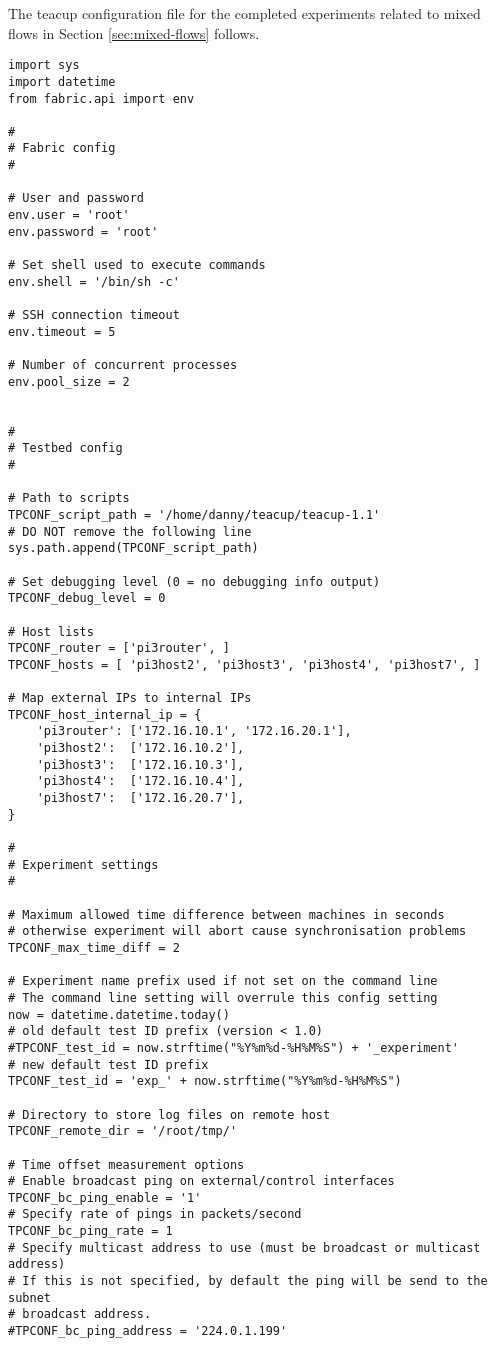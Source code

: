 The \gls{teacup} configuration file for the completed experiments related to mixed flows in Section \ref{sec:mixed-flows} follows.

\begin{code}
\begin{verbatim}
import sys
import datetime
from fabric.api import env

#
# Fabric config
#

# User and password
env.user = 'root'
env.password = 'root'

# Set shell used to execute commands
env.shell = '/bin/sh -c'

# SSH connection timeout
env.timeout = 5

# Number of concurrent processes
env.pool_size = 2


#
# Testbed config
#

# Path to scripts
TPCONF_script_path = '/home/danny/teacup/teacup-1.1'
# DO NOT remove the following line
sys.path.append(TPCONF_script_path)

# Set debugging level (0 = no debugging info output) 
TPCONF_debug_level = 0

# Host lists
TPCONF_router = ['pi3router', ]
TPCONF_hosts = [ 'pi3host2', 'pi3host3', 'pi3host4', 'pi3host7', ]

# Map external IPs to internal IPs
TPCONF_host_internal_ip = {
    'pi3router': ['172.16.10.1', '172.16.20.1'],
    'pi3host2':  ['172.16.10.2'],
    'pi3host3':  ['172.16.10.3'],
    'pi3host4':  ['172.16.10.4'],
    'pi3host7':  ['172.16.20.7'],
}

#
# Experiment settings
#

# Maximum allowed time difference between machines in seconds
# otherwise experiment will abort cause synchronisation problems
TPCONF_max_time_diff = 2

# Experiment name prefix used if not set on the command line
# The command line setting will overrule this config setting
now = datetime.datetime.today()
# old default test ID prefix (version < 1.0)
#TPCONF_test_id = now.strftime("%Y%m%d-%H%M%S") + '_experiment'
# new default test ID prefix
TPCONF_test_id = 'exp_' + now.strftime("%Y%m%d-%H%M%S")

# Directory to store log files on remote host
TPCONF_remote_dir = '/root/tmp/'

# Time offset measurement options
# Enable broadcast ping on external/control interfaces
TPCONF_bc_ping_enable = '1'
# Specify rate of pings in packets/second
TPCONF_bc_ping_rate = 1
# Specify multicast address to use (must be broadcast or multicast address)
# If this is not specified, by default the ping will be send to the subnet
# broadcast address.
#TPCONF_bc_ping_address = '224.0.1.199'


\end{verbatim}
\end{code}
